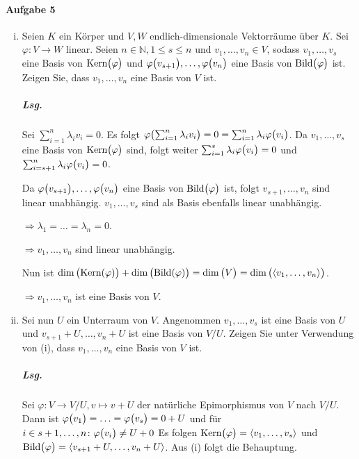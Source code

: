 \documentclass{scrreprt}
\newcommand\Bild{\text{Bild}}
\newcommand\Kern{\text{Kern}}
\begin{document}
\paragraph{Aufgabe 5}
\begin{enumerate}[(i)]
\item Seien $K$ ein Körper und $V, W$ endlich-dimensionale Vektorräume über $K$.
  Sei $\varphi \colon V \to W$ linear.
  Seien $n \in \mathbb{N}, 1 \leq s \leq n$ und $v_1, \ldots, v_n \in V$, sodass
  $v_1, \ldots, v_s$ eine Basis von $\Kern\qty\big(\varphi)$ und
  $\varphi\qty\big(v_{s + 1}), \ldots, \varphi\qty\big(v_n)$ eine Basis von
  $\Bild\qty\big(\varphi)$ ist.
  Zeigen Sie, dass $v_1, \ldots, v_n$ eine Basis von $V$ ist.

  \subparagraph{Lsg.} Sei $\sum_{i = 1}^n \lambda_i v_i = 0$.
  Es folgt $\varphi\qty\big(\sum_{i = 1}^n \lambda_i v_i) = 0 =
  \sum_{i = 1}^n \lambda_i \varphi\qty\big( v_i)$.
  Da $v_1, \ldots, v_s$ eine Basis von $\Kern\qty\big(\varphi)$ sind, folgt
  weiter $\sum_{i = 1}^s \lambda_i \varphi\qty\big( v_i) = 0$ und
  $\sum_{i = s + 1}^n \lambda_i \varphi\qty\big( v_i) = 0$.

  Da $\varphi\qty\big(v_{s + 1}), \ldots, \varphi\qty\big(v_n)$ eine Basis von
  $\Bild\qty\big(\varphi)$ ist, folgt $v_{s + 1}, \ldots, v_n$ sind linear
  unabhängig.
  $v_1, \ldots, v_s$ sind als Basis ebenfalls linear unabhängig.

  $\Rightarrow \lambda_1 = \ldots = \lambda_n = 0$.

  $\Rightarrow v_1, \ldots, v_n$ sind linear unabhängig.

  Nun ist $\dim\qty\big(\Kern(\varphi)) + \dim\qty\big(\Bild(\varphi)) =
  \dim\qty\big(V) = \dim\qty\big(\langle v_1, \ldots, v_n\rangle)$.

  $\Rightarrow v_1, \ldots, v_n$ ist eine Basis von $V$.

\item Sei nun $U$ ein Unterraum von $V$.
  Angenommen $v_1, \ldots, v_s$ ist eine Basis von $U$ und
  $v_{s + 1} + U, \ldots, v_n + U$ ist eine Basis von $V / U$.
  Zeigen Sie unter Verwendung von (i), dass $v_1, \ldots, v_n$ eine
  Basis von $V$ ist.

  \subparagraph{Lsg.} Sei $\varphi \colon V \to V / U, v \mapsto v + U$ der
  natürliche Epimorphismus von $V$ nach $V / U$.
  Dann ist $\varphi\qty\big(v_1) = \ldots = \varphi\qty\big(v_s) = 0 + U$
  und für $i \in s + 1, \ldots, n \colon \varphi\qty\big(v_i) \ne U + 0$
  Es folgen $\Kern\qty\big(\varphi) = \langle v_1, \ldots, v_s \rangle$ und
  $\Bild\qty\big(\varphi) = \langle
  v_{s + 1} + U, \ldots, v_n + U
  \rangle$.
  Aus (i) folgt die Behauptung.
\end{enumerate}
\end{document}
